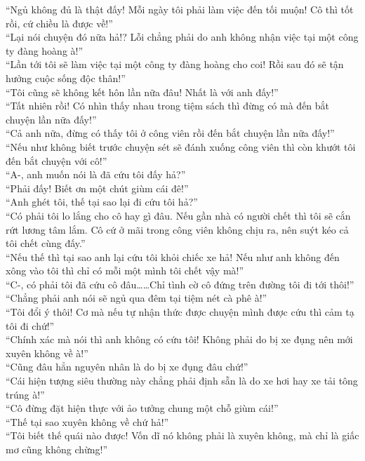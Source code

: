 \documentclass[12pt,a4paper, twosides]{book}
\begin{document}
“Ngủ không đủ là thật đấy! Mỗi ngày tôi phải làm việc đến tối muộn! Cô thì tốt rồi, cứ chiều là được về!”\\
“Lại nói chuyện đó nữa hả!? Lỗi chẳng phải do anh không nhận việc tại một công ty đàng hoàng à!”\\
“Lần tới tôi sẽ làm việc tại một công ty đàng hoàng cho coi! Rồi sau đó sẽ tận hưởng cuộc sống độc thân!”\\
“Tôi cũng sẽ không kết hôn lần nữa đâu! Nhất là với anh đấy!”\\
“Tất nhiên rồi! Có nhìn thấy nhau trong tiệm sách thì đừng có mà đến bắt chuyện lần nữa đấy!”\\
“Cả anh nữa, đừng có thấy tôi ở công viên rồi đến bắt chuyện lần nữa đấy!”\\
“Nếu như không biết trước chuyện sét sẽ đánh xuống công viên thì còn khướt tôi đến bắt chuyện với cô!”\\
“A-, anh muốn nói là đã cứu tôi đấy hả?”\\
“Phải đấy! Biết ơn một chút giùm cái đê!”\\
“Anh ghét tôi, thế tại sao lại đi cứu tôi hả?”\\
“Có phải tôi lo lắng cho cô hay gì đâu. Nếu gần nhà có người chết thì tôi sẽ cắn rứt lương tâm lắm. Cô cứ ở mãi trong công viên không chịu ra, nên suýt kéo cả tôi chết cùng đấy.”\\
“Nếu thế thì tại sao anh lại cứu tôi khỏi chiếc xe hả! Nếu như anh không đến xông vào tôi thì chỉ có mỗi một mình tôi chết vậy mà!”\\
“C-, có phải tôi đã cứu cô đâu……Chỉ tình cờ cô đứng trên đường tôi đi tới thôi!”\\
“Chẳng phải anh nói sẽ ngủ qua đêm tại tiệm nét cà phê à!”\\
“Tôi đổi ý thôi! Cơ mà nếu tự nhận thức được chuyện mình được cứu thì cảm tạ tôi đi chứ!”\\
“Chính xác mà nói thì anh không có cứu tôi! Không phải do bị xe đụng nên mới xuyên không về à!”\\
“Cũng đâu hẳn nguyên nhân là do bị xe đụng đâu chứ!”\\
“Cái hiện tượng siêu thường này chẳng phải định sẵn là do xe hơi hay xe tải tông trúng à!”\\
“Cô đừng đặt hiện thực với ảo tưởng chung một chỗ giùm cái!”\\
“Thế tại sao xuyên không về chứ hả!”\\
“Tôi biết thế quái nào được! Vốn dĩ nó không phải là xuyên không, mà chỉ là giấc mơ cũng không chừng!”\\
\end{document}

